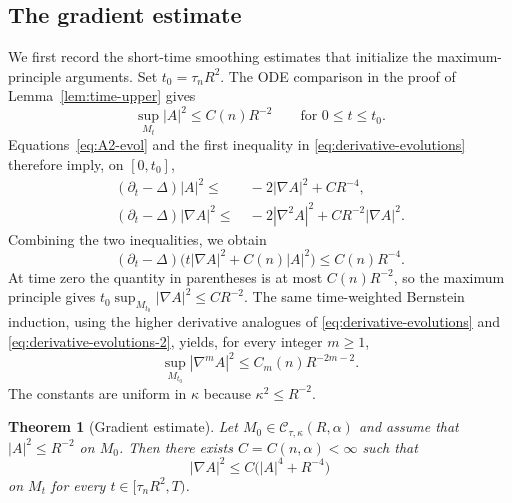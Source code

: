 \documentclass[11pt,reqno]{amsart}
\newtheorem{theorem}[proposition]{Theorem}
\theoremstyle{definition}
\theoremstyle{remark}
\numberwithin{equation}{section}
\newcommand{\CC}{\mathcal C}
\begin{document}
\subsection{The gradient estimate}

We first record the short-time smoothing estimates that initialize the
maximum-principle arguments.  Set $t_0=\tau_nR^2$.  The ODE comparison in the
proof of Lemma~\ref{lem:time-upper} gives
\begin{equation*}
 \sup_{M_t}|A|^2\leq C(n)R^{-2}
 \qquad\text{for }0\leq t\leq t_0.
\end{equation*}
Equations~\eqref{eq:A2-evol} and the first inequality in
\eqref{eq:derivative-evolutions} therefore imply, on $[0,t_0]$,
\begin{align*}
 (\partial_t-\Delta)|A|^2
 \leq &~-2|\nabla A|^2+CR^{-4},\\
 (\partial_t-\Delta)|\nabla A|^2
 \leq&~-2|\nabla^2A|^2+CR^{-2}|\nabla A|^2.
\end{align*}
Combining the two inequalities, we obtain
\begin{equation*}
 (\partial_t-\Delta)
 \bigl(t|\nabla A|^2+C(n)|A|^2\bigr)
 \leq C(n)R^{-4}.
\end{equation*}
At time zero the quantity in parentheses is at most $C(n)R^{-2}$, so the
maximum principle gives
$t_0\sup_{M_{t_0}}|\nabla A|^2\leq CR^{-2}$.  The same time-weighted
Bernstein induction, using the higher derivative analogues of
\eqref{eq:derivative-evolutions} and \eqref{eq:derivative-evolutions-2}, yields, for every integer $m\geq1$,
\begin{equation}\label{eq:short-time-smoothing}
 \sup_{M_{t_0}}|\nabla^mA|^2
 \leq C_m(n)R^{-2m-2}.
\end{equation}
The constants are uniform in $\kappa$ because $\kappa^2\leq R^{-2}$.



\begin{theorem}[Gradient estimate]\label{thm:gradient}
Let $M_0\in\CC_{\tau,\kappa}(R,\alpha)$ and assume that
$|A|^2\leq R^{-2}$ on $M_0$.  Then there exists
$C=C(n,\alpha)<\infty$ such that
\begin{equation}\label{eq:gradient-est}
 |\nabla A|^2
 \leq C\bigl(|A|^4+R^{-4}\bigr)
\end{equation}
on $M_t$ for every $t\in[\tau_nR^2,T)$.
\end{theorem}
\end{document}
